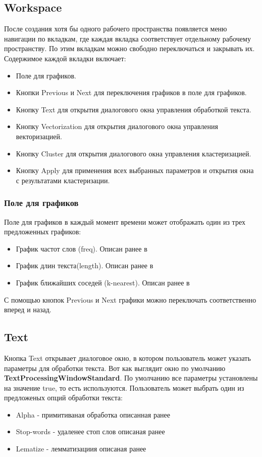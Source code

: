 	\subsection{Workspace}
		После создания хотя бы одного рабочего пространства появляется меню навигации по вкладкам, где каждая вкладка соответствует отдельному рабочему пространству. По этим вкладкам можно свободно переключаться и закрывать их. Содержимое каждой вкладки включает:
		\begin{itemize}
			\item Поле для графиков.
			\item Кнопки Previous и Next для переключения графиков в поле для графиков.
			\item Кнопку Text для открытия диалогового окна управления обработкой текста.
			\item Кнопку Vectorization для открытия диалогового окна управления векторизацией.
			\item Кнопку Cluster для открытия диалогового окна управления кластеризацией.
			\item Кнопку Apply для применения всех выбранных параметров и открытия окна с результатами кластеризации.
		\end{itemize}
		
	\subsubsection{Поле для графиков}
			Поле для графиков в каждый момент времени может отображать один из трех предложенных графиков:
			\begin{itemize}
				\item График частот слов (freq). Описан ранее в 
				\item График длин текста(length). Описан ранее в
				\item График ближайших соседей (k-nearest). Описан ранее в
			\end{itemize}					
			
			С помощью кнопок Previous и Next графики можно переключать соответственно вперед и назад.		
		
	\subsection{Text}
			Кнопка Text открывает диалоговое окно, в котором пользователь может указать параметры для обработки текста. Вот как выглядит окно по умолчанию \textbf{TextProcessingWindowStandard}. По умолчанию все параметры установлены на значение true, то есть используются.
		Пользователь может выбрать один из предложеных опций обработки текста:
		\begin{itemize}
			\item Alpha - примитиваная обработка описанная ранее
			\item Stop-words - удаленее стоп слов описаная ранее
			\item Lematize - лемматизациия описаная ранее
		\end{itemize}
			
